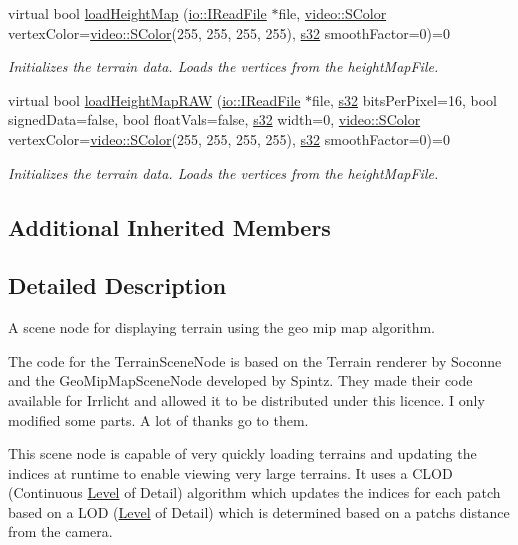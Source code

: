 \begin{DoxyCompactItemize}
virtual bool \hyperlink{classirr_1_1scene_1_1ITerrainSceneNode_ae5c598195e3faafb7cc58b71beb7ee1b}{load\+Height\+Map} (\hyperlink{classirr_1_1io_1_1IReadFile}{io\+::\+I\+Read\+File} $\ast$file, \hyperlink{classirr_1_1video_1_1SColor}{video\+::\+S\+Color} vertex\+Color=\hyperlink{classirr_1_1video_1_1SColor}{video\+::\+S\+Color}(255, 255, 255, 255), \hyperlink{namespaceirr_ac66849b7a6ed16e30ebede579f9b47c6}{s32} smooth\+Factor=0)=0
\begin{DoxyCompactList}\small\item\em Initializes the terrain data. Loads the vertices from the height\+Map\+File. \end{DoxyCompactList}\item 
virtual bool \hyperlink{classirr_1_1scene_1_1ITerrainSceneNode_a43d92272d8d860dda1c74b9fe795f062}{load\+Height\+Map\+R\+AW} (\hyperlink{classirr_1_1io_1_1IReadFile}{io\+::\+I\+Read\+File} $\ast$file, \hyperlink{namespaceirr_ac66849b7a6ed16e30ebede579f9b47c6}{s32} bits\+Per\+Pixel=16, bool signed\+Data=false, bool float\+Vals=false, \hyperlink{namespaceirr_ac66849b7a6ed16e30ebede579f9b47c6}{s32} width=0, \hyperlink{classirr_1_1video_1_1SColor}{video\+::\+S\+Color} vertex\+Color=\hyperlink{classirr_1_1video_1_1SColor}{video\+::\+S\+Color}(255, 255, 255, 255), \hyperlink{namespaceirr_ac66849b7a6ed16e30ebede579f9b47c6}{s32} smooth\+Factor=0)=0
\begin{DoxyCompactList}\small\item\em Initializes the terrain data. Loads the vertices from the height\+Map\+File. \end{DoxyCompactList}\end{DoxyCompactItemize}
\subsection*{Additional Inherited Members}


\subsection{Detailed Description}
A scene node for displaying terrain using the geo mip map algorithm. 

The code for the Terrain\+Scene\+Node is based on the Terrain renderer by Soconne and the Geo\+Mip\+Map\+Scene\+Node developed by Spintz. They made their code available for Irrlicht and allowed it to be distributed under this licence. I only modified some parts. A lot of thanks go to them.

This scene node is capable of very quickly loading terrains and updating the indices at runtime to enable viewing very large terrains. It uses a C\+L\+OD (Continuous \hyperlink{classLevel}{Level} of Detail) algorithm which updates the indices for each patch based on a L\+OD (\hyperlink{classLevel}{Level} of Detail) which is determined based on a patch\textquotesingle{}s distance from the camera.

